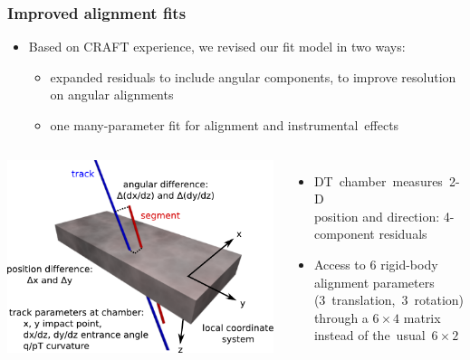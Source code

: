 \documentclass[compress]{beamer}
\begin{document}
\begin{frame}
\frametitle{Improved alignment fits}

\begin{itemize}
\item Based on CRAFT experience, we revised our fit model in two ways:
\begin{itemize}
\item expanded residuals to include angular components, to improve
  resolution on angular alignments
\item one many-parameter fit for alignment and \mbox{instrumental effects\hspace{-1 cm}}
\end{itemize}
\end{itemize}

\begin{columns}
\includegraphics[width=\linewidth]{dt_coordinates.pdf}

\begin{itemize}
\item \mbox{DT chamber measures 2-D\hspace{-1 cm}} \\ position and direction: 4-component residuals
\item Access to 6 rigid-body alignment parameters \mbox{(3~translation, 3~rotation)\hspace{-0.5 cm}} \\ through a $6\times 4$ matrix \\ instead of \mbox{the usual $6\times 2$\hspace{-1 cm}}
\end{itemize}
\end{columns}


\end{frame}
\end{document}
